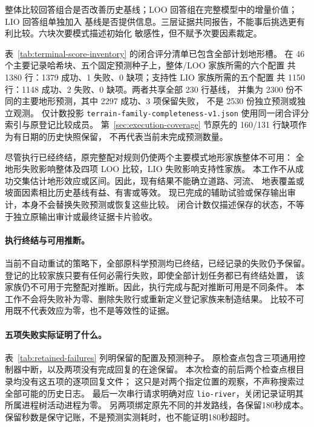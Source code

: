 \documentclass[UTF8,11pt]{ctexart}
\begin{document}
整体比较回答组合是否改善历史基线；LOO 回答组在完整模型中的增量价值；LIO 回答组单独加入
基线是否提供信息。三层证据共同报告，不能事后挑选更有利比较。六块次要模式描述初始化
敏感性，但不赋予次要因素裁定。

表~\ref{tab:terminal-score-inventory} 的闭合评分清单已包含全部计划地形槽。
在 46 个主要记录哈希块、五个固定预测种子上，整体/LOO 家族所需的六个配置
共 1380 行：1379 成功、1 失败、0 缺项；支持性 LIO 家族所需的五个配置
共 1150 行：1148 成功、2 失败、0 缺项。两者共享全部 230 行基线，
并集为 2300 份不同的主要地形预测，其中 2297 成功、3 项保留失败，
不是 2530 份独立预测或独立观测。
仅计数投影 \texttt{terrain-family-completeness-v1.json} 使用同一闭合评分索引与原登记比较成员。
第~\ref{sec:execution-coverage} 节原先的 160/131 行缺项作为有日期的历史快照保留，
不再代表当前未完成预测数量。

尽管执行已经终结，原完整配对规则仍使两个主要模式地形家族整体不可用：
全地形失败影响整体及四项 LOO 比较，LIO 失败影响支持性家族。
本工作不从成功交集估计地形效应或区间。因此，现有结果不能确立道路、河流、
地表覆盖或坡面因素相比历史基线有益、有害或等效。
现已完成的辅助试验或保存输出审计，本身不会替换失败预测或恢复这些比较。
闭合计数仅描述保存的状态，不等于独立原输出审计或最终证据卡片验收。

\paragraph{执行终结与可用推断。}
\label{sec:terminal-failures}
当前不自动重试的策略下，全部原科学预测均已终结，已经记录的失败仍予保留。
登记的比较家族只要有任何必需行失败，即使全部计划任务都已有终结处置，
该家族仍不可用于完整配对推断。因此，执行完成与配对推断可用是不同条件。
本工作不会将失败补为零、删除失败行或重新定义登记家族来制造结果。
比较不可用既不代表效应为零，也不是等效性的证据。

\paragraph{五项失败实际证明了什么。}
表~\ref{tab:retained-failures} 列明保留的配置及预测种子。
原检查点包含三项通用控制器中断，以及两项没有完成回复的在途保留。
本次检查的前后两个检查点根目录均没有这五项的逐项回复文件；
这只是对两个指定位置的观察，不声称搜索过全部可能的历史日志。
最后一次串行请求明确对应 \texttt{lio-river}，关闭记录证明其所属进程树活动进程为零。
另两项绑定原先不同的并发路线，各保留180秒成本。
保留秒数是保守记账，不是预测实测耗时，也不能证明180秒超时。
\end{document}
